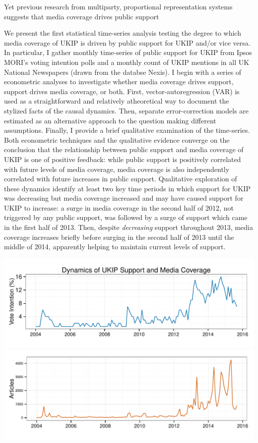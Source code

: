 \documentclass[12pt,article]{article}
\begin{document}
Yet previous research from multiparty, proportional representation
systems suggests that media coverage drives public support

We present the first statistical time-series analysis testing the degree
to which media coverage of UKIP is driven by public support for UKIP
and/or vice versa. In particular, I gather monthly time-series of public
support for UKIP from Ipsos MORI's voting intention polls and a monthly
count of UKIP mentions in all UK National Newspapers (drawn from the
databse Nexis). I begin with a series of econometric analyses to
investigate whether media coverage drives support, support drives media
coverage, or both. First, vector-autoregression (VAR) is used as a
straightforward and relatively atheoretical way to document the stylized
facts of the causal dynamics. Then, separate error-correction models are
estimated as an alternative approach to the question making different
assumptions. Finally, I provide a brief qualitative examination of the
time-series. Both econometric techniques and the qualitative evidence
converge on the conclusion that the relationship between public support
and media coverage of UKIP is one of positive feedback: while public
support is positively correlated with future levels of media coverage,
media coverage is also independently correlated with future increases in
public support. Qualitative exploration of these dynamics identify at
least two key time periods in which support for UKIP was decreasing but
media coverage increased and may have caused support for UKIP to
increase: a surge in media coverage in the second half of 2012, not
triggered by any public support, was followed by a surge of support
which came in the first half of 2013. Then, despite \emph{decreasing}
support throughout 2013, media coverage increases briefly before surging
in the second half of 2013 until the middle of 2014, apparently helping
to maintain current levels of support.

\pagebreak

\includegraphics{ukip_media_files/figure-latex/unnamed-chunk-1-1.pdf}
\includegraphics{ukip_media_files/figure-latex/unnamed-chunk-1-2.pdf}
\end{document}
